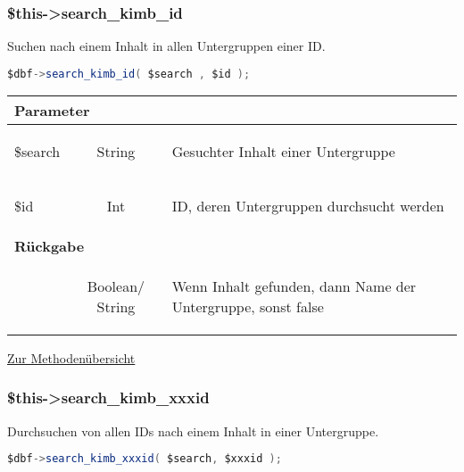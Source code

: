 \documentclass[paper=A4,pagesize=auto,12pt,headinclude=true,footinclude=true,BCOR=0mm,DIV=calc]{scrartcl}
\begin{document}
  \subsubsection{\$this->search\_kimb\_id}
  \label{sec:mth_id_search}
	    Suchen nach einem Inhalt in allen Untergruppen einer ID.
	    \begin{lstlisting}[gobble=4,language=Java]
	      $dbf->search_kimb_id( $search , $id ); 
	    \end{lstlisting}
	    
	     \begin{tabular}{|lcp{}|}
		    \hline
		      \multicolumn{3}{|l|}{ \textbf{Parameter} } \\
		    \hline
		      \$search & String & \begin{itshape} Gesuchter Inhalt einer Untergruppe \end{itshape} \\
		      \$id & Int & \begin{itshape} ID, deren Untergruppen durchsucht werden \end{itshape} \\
		    \hline
		      \multicolumn{3}{|l|}{ \textbf{Rückgabe} } \\
		    \hline
			  & Boolean/ String & \begin{itshape} Wenn Inhalt gefunden, dann Name der Untergruppe, sonst false \end{itshape} \\
		    \hline
	    \end{tabular}
	    \begin{flushright} \small \hyperref[tab:methodenuerbersicht]{Zur Methodenübersicht} \end{flushright}
  
  \subsubsection{\$this->search\_kimb\_xxxid}
  \label{sec:mth_search_xx}
	    Durchsuchen von allen IDs nach einem Inhalt in einer Untergruppe.
	    \begin{lstlisting}[gobble=4,language=Java]
	$dbf->search_kimb_xxxid( $search, $xxxid ); 
	    \end{lstlisting}
	    
\end{document}
